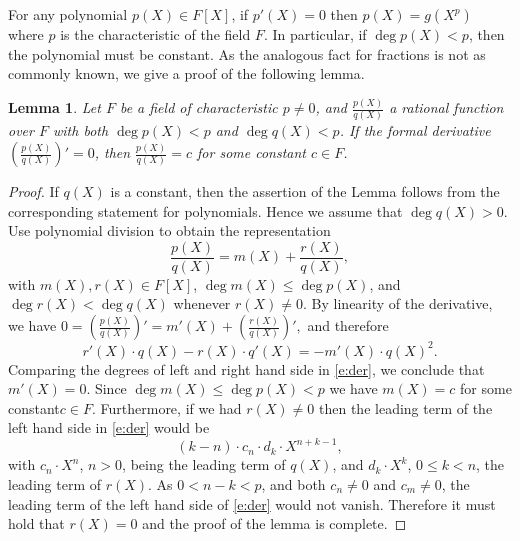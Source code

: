 \documentclass[11pt]{article}
\newtheorem{lem}[]{Lemma}
\theoremstyle{definition}
\theoremstyle{definition}
\begin{document}
For any polynomial $p(X)\in F[X]$, if $p'(X)=0$ then $p(X)= g(X^p)$ where $p$ is the characteristic of the field $F$.
In particular, if $\deg p(X) < p$, then the polynomial must be constant.
As the analogous fact for fractions is not as commonly known, we give a proof of the following lemma.

\begin{lem}
\label{lem:DerivativeFraction}
Let  $F$ be a field of characteristic $p\neq 0$, and $\frac{p(X)}{q(X)}$ a rational function over $F$ with both  $\deg p(X) < p$ and $\deg q(X) < p$.
If the formal derivative $\left(\frac{p(X)}{q(X)}\right)' = 0$, then $\frac{p(X)}{q(X)} = c$ for some constant $c\in F$.
\end{lem}

\begin{proof}
If $q(X)$ is a constant, then the assertion of the Lemma follows from the corresponding statement for polynomials.
Hence we assume that $\deg q(X)>0$.
Use polynomial division to obtain the representation
\[
\frac{p(X)}{q(X)} = m(X) + \frac{r(X)}{q(X)},
\]
with $m(X), r(X) \in F[X]$, $\deg m(X) \leq \deg p(X)$, and $\deg r(X) < \deg q(X)$ whenever $r(X)\neq 0$.
By linearity of the derivative, we have
$
0 =  \left(\frac{p(X)}{q(X)}\right)' = m'(X) + \left(\frac{r(X)}{q(X)}\right)',
$
and therefore
\begin{equation}
\label{e:der}
r'(X)\cdot q(X) - r(X)\cdot q'(X) = - m'(X)\cdot q(X)^2.
\end{equation}
Comparing the degrees of left and right hand side in \eqref{e:der}, we conclude that  $m'(X) = 0$.
Since $\deg m(X) \leq  \deg p(X) < p$ we have $m(X)= c$ for some constant\footnotemark $c\in F$. 
% 
Furthermore, if we had $r(X)\neq 0$ then the leading term of the left hand side in \eqref{e:der} would be
\[
(k - n) \cdot c_n\cdot d_{k} \cdot X^{n + k - 1},
\]
with $c_n \cdot X^n$, $n>0$, being the leading term of $q(X)$, and  $d_k \cdot X^k$, $0\leq k < n$, the leading term of $r(X)$.
As  $0 < n - k < p$, and both $c_n\neq 0$ and $c_m\neq 0$, the leading term of the left hand side of \eqref{e:der} would not vanish.
Therefore it must hold that  $r(X) = 0$ and the proof of the lemma is complete.
\end{proof}
\end{document}
